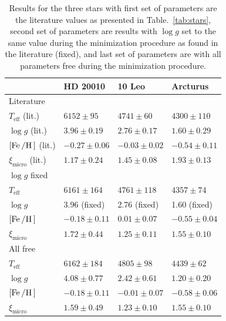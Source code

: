 \begin{table}[htb!]
    \caption{Results for the three stars with first set of parameters are the
             literature values as presented in Table.~\ref{tab:stars}, second
             set of parameters are results with $\log g$ set to the same value
             during the minimization procedure as found in the literature
             (fixed), and last set of parameters are with all parameters free
             during the minimization procedure.}
    \label{tab:results}
    \centering
    \begin{tabular}{llll}
      \hline\hline
                                    & HD 20010          &  10 Leo           &  Arcturus        \\
      \hline
        Literature                  &                   &                   &                  \\
        $T_\mathrm{eff}$ (lit.)     & $6152 \pm  95$    &  $4741 \pm  60$   & $4300 \pm 110$   \\
        $\log g$ (lit.)             & $3.96 \pm 0.19$   &  $2.76 \pm 0.17$  & $1.60 \pm 0.29$  \\
        $[\ion{Fe}/\ion{H}]$ (lit.) & $-0.27 \pm 0.06$  &  $-0.03 \pm 0.02$ & $-0.54 \pm 0.11$ \\
        $\xi_\mathrm{micro}$ (lit.) & $1.17 \pm 0.24$   &  $1.45 \pm 0.08$  & $1.93 \pm 0.13$  \\
      \hline
        $\log g$ fixed              &                   &                   &                  \\
        $T_\mathrm{eff}$            & $6161 \pm 164$    &  $4761 \pm 118$   & $4357 \pm  74$   \\
        $\log g$                    & 3.96 (fixed)      &  2.76 (fixed)     & 1.60 (fixed)     \\
        $[\ion{Fe}/\ion{H}]$        & $-0.18 \pm 0.11$  &  $ 0.01 \pm 0.07$ & $-0.55 \pm 0.04$ \\
        $\xi_\mathrm{micro}$        & $1.72 \pm 0.44$   &  $1.25 \pm 0.11$  & $1.55 \pm 0.10$  \\
      \hline
        All free                    &                   &                   &                  \\
        $T_\mathrm{eff}$            & $6162 \pm 184$    &  $4805 \pm  98$   & $4439 \pm  62$   \\
        $\log g$                    & $4.08 \pm 0.77$   &  $2.42 \pm 0.61$  & $1.20 \pm 0.20$  \\
        $[\ion{Fe}/\ion{H}]$        & $-0.18 \pm 0.11$  &  $-0.01 \pm 0.07$ & $-0.58 \pm 0.06$ \\
        $\xi_\mathrm{micro}$        & $1.59 \pm 0.49$   &  $1.23 \pm 0.10$  & $1.55 \pm 0.10$  \\
        \hline\hline
    \end{tabular}
\end{table}


